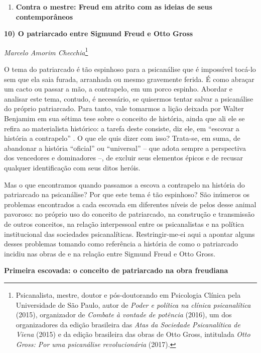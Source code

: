 \begin{enumerate}
\def\labelenumi{\Roman{enumi}.}
\setcounter{enumi}{3}
\item
  \textbf{Contra o mestre: Freud em atrito com as ideias de seus
  contemporâneos}
\end{enumerate}

\textbf{10) O patriarcado entre Sigmund Freud e Otto Gross}

\emph{Marcelo Amorim Checchia}\footnote{Psicanalista, mestre, doutor e
  pós-doutorando em Psicologia Clínica pela Universidade de São Paulo,
  autor de \emph{Poder e política na clínica psicanalítica} (2015),
  organizador de \emph{Combate à vontade de potência} (2016), um dos
  organizadores da edição brasileira das \emph{Atas da Sociedade
  Psicanalítica de Viena} (2015) e da edição brasileira das obras de
  Otto Gross, intitulada \emph{Otto Gross: Por uma psicanálise
  revolucionária} (2017).}

O tema do patriarcado é tão espinhoso para a psicanálise que é
impossível tocá-lo sem que ela saia furada, arranhada ou mesmo
gravemente ferida. É como abraçar um cacto ou passar a mão, a
contrapelo, em um porco espinho. Abordar e analisar este tema, contudo,
é necessário, se quisermos tentar salvar a psicanálise do próprio
patriarcado. Para tanto, vale tomarmos a lição deixada por Walter
Benjamim em sua sétima tese sobre o conceito de história, ainda que ali
ele se refira ao materialista histórico: a tarefa deste consiste, diz
ele, em ``escovar a história a contrapelo'' . O que ele quis dizer com
isso? Trata-se, em suma, de abandonar a história ``oficial'' ou
``universal'' -- que adota sempre a perspectiva dos vencedores e
dominadores --, de excluir seus elementos épicos e de recusar qualquer
identificação com seus ditos heróis.

Mas o que encontramos quando passamos a escova a contrapelo na história
do patriarcado na psicanálise? Por que este tema é tão espinhoso? São
inúmeros os problemas encontrados a cada escovada em diferentes níveis
de pelos desse animal pavoroso: no próprio uso do conceito de
patriarcado, na construção e transmissão de outros conceitos, na relação
interpessoal entre os psicanalistas e na política institucional das
sociedades psicanalíticas. Restringir-me-ei aqui a apontar alguns desses
problemas tomando como referência a história de como o patriarcado
incidiu nas obras de e na relação entre Sigmund Freud e Otto Gross.

\textbf{Primeira escovada: o conceito de patriarcado na obra freudiana}

